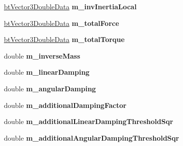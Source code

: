 \begin{DoxyCompactItemize}
\item 
\hypertarget{structbt_rigid_body_double_data_a493eb15b5ae3a1c0d19610a3e24c3357}{\hyperlink{structbt_vector3_double_data}{bt\+Vector3\+Double\+Data} {\bfseries m\+\_\+inv\+Inertia\+Local}}\label{structbt_rigid_body_double_data_a493eb15b5ae3a1c0d19610a3e24c3357}

\item 
\hypertarget{structbt_rigid_body_double_data_a370ccd1f375cf11ad3191e1190b9cb88}{\hyperlink{structbt_vector3_double_data}{bt\+Vector3\+Double\+Data} {\bfseries m\+\_\+total\+Force}}\label{structbt_rigid_body_double_data_a370ccd1f375cf11ad3191e1190b9cb88}

\item 
\hypertarget{structbt_rigid_body_double_data_a5bfc8b9a2c6a8a39f2f455b3e21e6358}{\hyperlink{structbt_vector3_double_data}{bt\+Vector3\+Double\+Data} {\bfseries m\+\_\+total\+Torque}}\label{structbt_rigid_body_double_data_a5bfc8b9a2c6a8a39f2f455b3e21e6358}

\item 
\hypertarget{structbt_rigid_body_double_data_ad1e8bc05737751f9474e0fc9b5c98dd7}{double {\bfseries m\+\_\+inverse\+Mass}}\label{structbt_rigid_body_double_data_ad1e8bc05737751f9474e0fc9b5c98dd7}

\item 
\hypertarget{structbt_rigid_body_double_data_a375256641f03d7106c22120c5a92c664}{double {\bfseries m\+\_\+linear\+Damping}}\label{structbt_rigid_body_double_data_a375256641f03d7106c22120c5a92c664}

\item 
\hypertarget{structbt_rigid_body_double_data_a1ef14e8c336780e6f41da944f2b474eb}{double {\bfseries m\+\_\+angular\+Damping}}\label{structbt_rigid_body_double_data_a1ef14e8c336780e6f41da944f2b474eb}

\item 
\hypertarget{structbt_rigid_body_double_data_aeae5431d9118ec986bdb9974e3f7129c}{double {\bfseries m\+\_\+additional\+Damping\+Factor}}\label{structbt_rigid_body_double_data_aeae5431d9118ec986bdb9974e3f7129c}

\item 
\hypertarget{structbt_rigid_body_double_data_a616cdeab7f6dd4510ec72dcdaef118ca}{double {\bfseries m\+\_\+additional\+Linear\+Damping\+Threshold\+Sqr}}\label{structbt_rigid_body_double_data_a616cdeab7f6dd4510ec72dcdaef118ca}

\item 
\hypertarget{structbt_rigid_body_double_data_aa8ea9f657ce5ec1c902c242fc23bf593}{double {\bfseries m\+\_\+additional\+Angular\+Damping\+Threshold\+Sqr}}\label{structbt_rigid_body_double_data_aa8ea9f657ce5ec1c902c242fc23bf593}


\end{DoxyCompactItemize}
